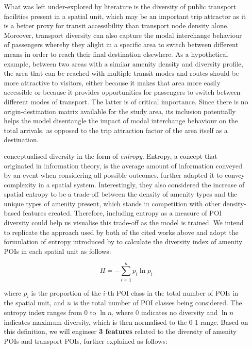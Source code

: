 What was left under-explored by literature is the diversity of public transport facilities present in a spatial unit, which may be an important trip attractor as it is a better proxy for transit accessibility than transport node density alone. Moreover, transport diversity can also capture the modal interchange behaviour of passengers whereby they alight in a specific area to switch between different means in order to reach their final destination elsewhere. As a hypothetical example, between two areas with a similar amenity density and diversity profile, the area that can be reached with multiple transit modes and routes should be more attractive to visitors, either because it makes that area more easily accessible or because it provides opportunities for passengers to switch between different modes of transport. The latter is of critical importance. Since there is no origin-destination matrix available for the study area, its inclusion potentially helps the model disentangle the impact of modal interchange behaviour on the total arrivals, as opposed to the trip attraction factor of the area itself as a destination.

\citet{cerveroTravelDemand3Ds1997} conceptualised diversity in the form of \textit{entropy}. Entropy, a concept that originated in information theory, is the average amount of information conveyed by an event when considering all possible outcomes. \citet{battyEntropyComplexitySpatial2014} further adapted it to convey complexity in a spatial system. Interestingly, they also considered the increase of spatial entropy to be a trade-off between the density of amenity types and the unique types of amenity present, which stands in competition with other density-based features created. Therefore, including entropy as a measure of POI diversity could help us visualise this trade-off as the model is trained. We intend to replicate the approach used by both of the cited works above and adopt the formulation of entropy introduced by \citet{shannonMathematicalTheoryCommunication1948} to calculate the diversity index of amenity POIs in each spatial unit as follows:

\begin{equation}
    H = -\sum_{i=1}^{n} p_i \ln p_i
\end{equation}

\noindent where $p_i$ is the proportion of the $i$-th POI class in the total number of POIs in the spatial unit, and $n$ is the total number of POI classes being considered. The entropy index ranges from 0 to $\ln n$, where 0 indicates no diversity and $\ln n$ indicates maximum diversity, which is then normalised to the 0-1 range. Based on this definition, we will engineer \textbf{3 features} related to the diversity of amenity POIs and transport POIs, further explained as follows:

